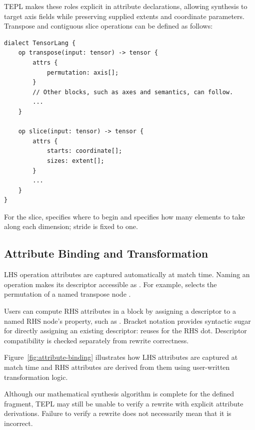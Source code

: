 TEPL makes these roles explicit in attribute declarations, allowing
synthesis to target axis fields while preserving supplied extents and
coordinate parameters. Transpose and contiguous slice operations can be
defined as follows:

\begin{lstlisting}[language=TEPL]
dialect TensorLang {
    op transpose(input: tensor) -> tensor {
        attrs {
            permutation: axis[];
        }
        // Other blocks, such as axes and semantics, can follow.
        ...
    }

    op slice(input: tensor) -> tensor {
        attrs {
            starts: coordinate[];
            sizes: extent[];
        }
        ...
    }
}
\end{lstlisting}
For the slice,  specifies where to begin and 
specifies how many elements to take along each dimension; stride is fixed
to one.

\subsection{Attribute Binding and Transformation}
\label{sec:binding}
LHS operation attributes are captured automatically at match time. Naming an operation
makes its descriptor accessible as . For example,
 selects the permutation of a named transpose
node .

Users can compute RHS attributes in a  block by assigning a
descriptor to a named RHS node's  property, such as
. Bracket notation provides syntactic sugar for directly
assigning an existing descriptor:  reuses
 for the RHS dot. Descriptor compatibility is checked
separately from rewrite correctness.

Figure~\ref{fig:attribute-binding} illustrates how LHS attributes are captured
at match time and RHS attributes are derived from them using user-written
transformation logic.


Although our mathematical synthesis algorithm is complete for the defined
fragment, TEPL may still be unable to verify a rewrite with explicit
attribute derivations. Failure to verify a rewrite does not necessarily
mean that it is incorrect.


